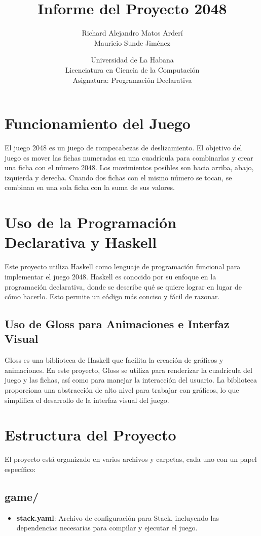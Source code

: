 \documentclass{article}
\title{Informe del Proyecto 2048}
\author{Richard Alejandro Matos Arderí \\ Mauricio Sunde Jiménez}
\date{Universidad de La Habana \\ Licenciatura en Ciencia de la Computación \\ Asignatura: Programación Declarativa}
\begin{document}
\maketitle

\section{Funcionamiento del Juego}
El juego 2048 es un juego de rompecabezas de deslizamiento. El objetivo del juego es mover las fichas numeradas en una cuadrícula para combinarlas y crear una ficha con el número 2048. Los movimientos posibles son hacia arriba, abajo, izquierda y derecha. Cuando dos fichas con el mismo número se tocan, se combinan en una sola ficha con la suma de sus valores.

\section{Uso de la Programación Declarativa y Haskell}
Este proyecto utiliza Haskell como lenguaje de programación funcional para implementar el juego 2048. Haskell es conocido por su enfoque en la programación declarativa, donde se describe qué se quiere lograr en lugar de cómo hacerlo. Esto permite un código más conciso y fácil de razonar.

\subsection{Uso de Gloss para Animaciones e Interfaz Visual}
Gloss es una biblioteca de Haskell que facilita la creación de gráficos y animaciones. En este proyecto, Gloss se utiliza para renderizar la cuadrícula del juego y las fichas, así como para manejar la interacción del usuario. La biblioteca proporciona una abstracción de alto nivel para trabajar con gráficos, lo que simplifica el desarrollo de la interfaz visual del juego.

\section{Estructura del Proyecto}
El proyecto está organizado en varios archivos y carpetas, cada uno con un papel específico:

\subsection{game/}
\begin{itemize}
    \item \textbf{stack.yaml}: Archivo de configuración para Stack, incluyendo las dependencias necesarias para compilar y ejecutar el juego.
\end{itemize}
\end{document}
